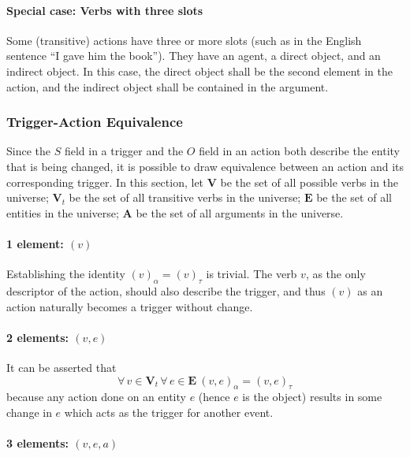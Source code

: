 \documentclass[letterpaper, twocolumn, 10pt, conference]{IEEEtran}
\begin{document}
\paragraph{Special case: Verbs with three slots}

Some (transitive) actions have three or more slots (such as in the English sentence \enquote{I gave him the book}). They have an agent, a direct object, and an indirect object. In this case, the direct object shall be the second element in the action, and the indirect object shall be contained in the argument.

\subsubsection{Trigger-Action Equivalence} \label{sssec:trigger_action_eq}

Since the $S$ field in a trigger and the $O$ field in an action both describe the entity that is being changed, it is possible to draw equivalence between an action and its corresponding trigger. In this section, let $ \mathbf{V} $ be the set of all possible verbs in the universe; $ \mathbf{V}_{t} $ be the set of all transitive verbs in the universe; $ \mathbf{E} $ be the set of all entities in the universe; $ \mathbf{A} $ be the set of all arguments in the universe.

\paragraph{1 element: $ (v) $}

Establishing the identity $ (v)_{\alpha} = (v)_{\tau} $ is trivial. The verb $v$, as the only descriptor of the action, should also describe the trigger, and thus $(v)$ as an action naturally becomes a trigger without change.

\paragraph{2 elements: $ (v, e)$}

It can be asserted that \[ \forall\, v \in \mathbf{V}_{t} \, \forall\, e \in \mathbf{E} \  (v, e)_{\alpha} = (v, e)_{\tau} \] because any action done on an entity $e$ (hence $e$ is the object) results in some change in $e$ which acts as the trigger for another event.

\paragraph{3 elements: $ (v, e, a)$}
\end{document}
